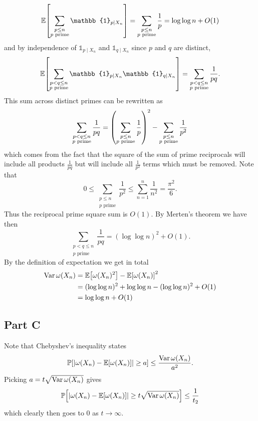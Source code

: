 \documentclass{eeleyes}
\begin{document}
\[
    \expp{\sum_{\substack{p \leq n \\ p\text{ prime}}} \mathbb{1}_{p \mid X_n}} = \sum_{\substack{p \leq n \\ p\text{ prime}}} \frac{1}{p} = \log \log n + O(1)
\]
and by independence of $\mathbb{1}_{p \mid X_n}$ and $\mathbb{1}_{q \mid X_n}$ since $p$ and $q$ are distinct,
\[
    \expp{\sum_{\substack{p < q \leq n \\ p\text{ prime}}} \mathbb{1}_{p \mid X_n} \mathbb{1}_{q \mid X_n}} = \sum_{\substack{p < q \leq n \\ p\text{ prime}}} \frac{1}{pq}
.\]
This sum across distinct primes can be rewritten as
\[
    \sum_{\substack{p < q \leq n \\ p\text{ prime}}} \frac{1}{pq} = \qty(\sum_{\substack{p \leq n \\ p\text{ prime}}} \frac{1}{p})^2 - \sum_{\substack{p \leq n \\ p\text{ prime}}} \frac{1}{p^2}
\]
which comes from the fact that the square of the sum of prime reciprocals will include all products $\frac{1}{pq}$ but will include all $\frac{1}{p^2}$ terms which must be removed. Note that
\[
    0 \leq \sum_{\substack{p \leq n \\ p\text{ prime}}} \frac{1}{p^2} \leq \sum_{n = 1}^n \frac{1}{n^2} = \frac{\pi^2}{6}
.\]
Thus the reciprocal prime square sum is $O(1)$. By Merten's theorem we have then
\[
    \sum_{\substack{p < q \leq n \\ p\text{ prime}}} \frac{1}{pq} = (\log \log n)^2 + O(1)
.\]
By the definition of expectation we get in total
\begin{align*}
    \varr \omega(X_n) &= \expp{\omega(X_n)^2} - \expp{\omega(X_n)}^2 \\
    &= (\log \log n)^2 + \log \log n - (\log \log n)^2 + O(1) \\
    &= \log \log n + O(1)
\end{align*}

\subsection*{Part C}
Note that Chebyshev's inequality states
\[
    \prob{|\omega(X_n) - \expp{\omega(X_n)}| \geq a} \leq \frac{\varr \omega(X_n)}{a^2}
.\]
Picking $a = t \sqrt{\operatorname{Var} \omega(X_n)}$ gives
\[
    \prob{|\omega(X_n) - \expp{\omega(X_n)}| \geq t \sqrt{\varr \omega(X_n)}} \leq \frac{1}{t_2}
\]
which clearly then goes to $0$ as $t \to \infty$.
\end{document}
